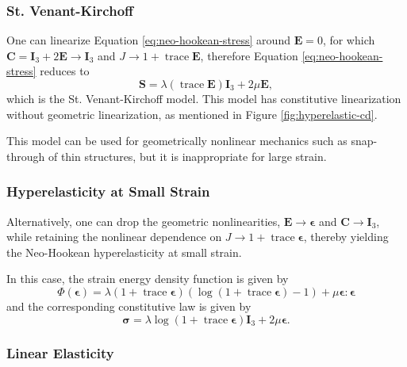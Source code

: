 \subsubsection{St. Venant-Kirchoff}

One can linearize Equation \ref{eq:neo-hookean-stress} around $\mathbf E = 0$, for which $\mathbf C = \mathbf I_3 + 2 \mathbf E \to \mathbf I_3$ and $J \to 1 + \operatorname{trace} \mathbf E$, therefore Equation \ref{eq:neo-hookean-stress} reduces to
\begin{equation}
      \mathbf S = \lambda (\operatorname{trace} \mathbf E) \mathbf I_3 + 2 \mu \mathbf E,
      \label{eq:st-venant-kirchoff}
\end{equation}
which is the St. Venant-Kirchoff model.
This model has constitutive linearization without geometric linearization, as mentioned in Figure \ref{fig:hyperelastic-cd}.

This model can be used for geometrically nonlinear mechanics such as snap-through of thin structures, but it is inappropriate for large strain.

\subsubsection{Hyperelasticity at Small Strain}

Alternatively, one can drop the geometric nonlinearities, $\mathbf E \to \boldsymbol \epsilon$ and $\mathbf C \to \mathbf I_3$, while retaining the nonlinear dependence on $J \to 1 + \operatorname{trace} \boldsymbol \epsilon$, thereby yielding the Neo-Hookean hyperelasticity at small strain.

In this case, the strain energy density function is given by
\begin{equation}
\Phi \left( \boldsymbol \epsilon \right) = \lambda \left( 1 + \operatorname{trace} \boldsymbol \epsilon \right) \left( \log \left( 1 + \operatorname{trace} \boldsymbol \epsilon \right) - 1 \right) + \mu \boldsymbol \epsilon : \boldsymbol \epsilon
\end{equation}
and the corresponding constitutive law is given by
\begin{equation}
\boldsymbol \sigma = \lambda \log \left( 1 + \operatorname{trace} \boldsymbol \epsilon \right) \mathbf I_3 + 2 \mu \boldsymbol \epsilon.
\end{equation}

\subsubsection{Linear Elasticity}


